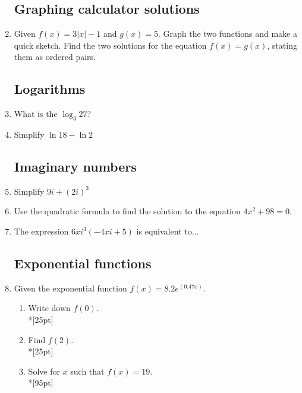 \documentclass[12pt, oneside]{article}
\begin{document}
\begin{enumerate}
\subsection*{Graphing calculator solutions}
\item Given $f(x) = 3|x|-1$ and $g(x)=5$. Graph the two functions and make a quick sketch. Find the two solutions for the equation $f(x)=g(x)$, stating them as ordered pairs.

\subsection*{Logarithms}
\item What is the $\log_3{27}$?
\item Simplify $\ln{18}-\ln{2}$

\subsection*{Imaginary numbers}
\item Simplify $9i+(2i)^3$
\item Use the quadratic formula to find the solution to the equation $4x^2+98=0$.
\item The expression $6xi^3(-4xi + 5)$ is equivalent to...

\subsection*{Exponential functions}

\item Given the exponential function $\displaystyle f(x)=8.2e^{(0.47x)}$.
\begin{enumerate}
    \item Write down $f(0)$.\\*[25pt]
    \item Find $f(2)$.\\*[25pt]
    \item Solve for $x$ such that $f(x)=19$.\\*[95pt]
\end{enumerate}

\end{enumerate}
\end{document}
